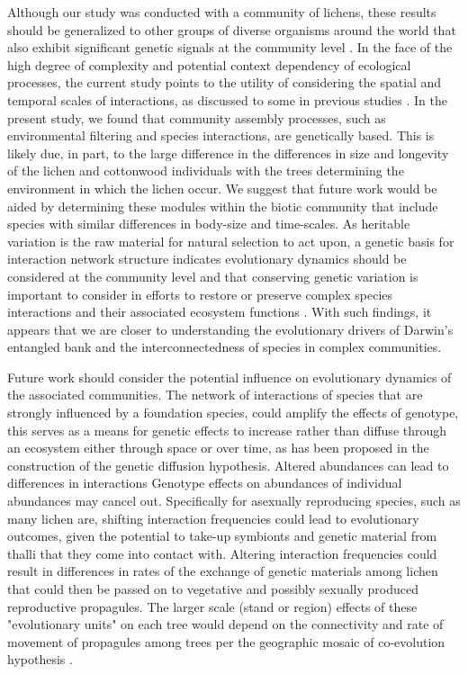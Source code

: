 \documentclass[11pt,twocolumn,twoside,lineno]{pnas-new}
\begin{document}
Although our study was conducted with a community of lichens, these
results should be generalized to other groups of diverse organisms
around the world that also exhibit significant genetic signals at the
community level \cite{Rowntree2011, Whitham2012}. In the face of the
high degree of complexity and potential context dependency of
ecological processes, the current study points to the utility of
considering the spatial and temporal scales of interactions, as
discussed to some in previous studies \cite{Bangert2006, Zook2010,
  Zytynska2012}. In the present study, we found that community
assembly processes, such as environmental filtering and species
interactions, are genetically based. This is likely due, in part, to
the large difference in the differences in size and longevity of the
lichen and cottonwood individuals with the trees determining the
environment in which the lichen occur. We suggest that future work
would be aided by determining these modules within the biotic
community that include species with similar differences in body-size
and time-scales. As heritable variation is the raw material for
natural selection to act upon, a genetic basis for interaction network
structure indicates evolutionary dynamics should be considered at the
community level and that conserving genetic variation is important to
consider in efforts to restore or preserve complex species
interactions and their associated ecosystem functions
\cite{Evans2013}.  With such findings, it appears that we are closer
to understanding the evolutionary drivers of Darwin's entangled bank
and the interconnectedness of species in complex communities.


Future work should consider the potential influence on evolutionary
dynamics of the associated communities. The network of interactions of
species that are strongly influenced by a foundation species, could
amplify the effects of genotype, this serves as a means for genetic
effects to increase rather than diffuse through an ecosystem either
through space or over time, as has been proposed in the construction
of the genetic diffusion hypothesis. Altered abundances can lead to
differences in interactions Genotype effects on abundances of
individual abundances may cancel out. Specifically for asexually
reproducing species, such as many lichen are, shifting interaction
frequencies could lead to evolutionary outcomes, given the potential
to take-up symbionts and genetic material from thalli that they come
into contact with. Altering interaction frequencies could result in
differences in rates of the exchange of genetic materials among lichen
that could then be passed on to vegetative and possibly sexually
produced reproductive propagules. The larger scale (stand or region)
effects of these "evolutionary units" on each tree would depend on the
connectivity and rate of movement of propagules among trees per the
geographic mosaic of co-evolution hypothesis \cite{Barbour2009c,
  Thompson2013}.
\end{document}

